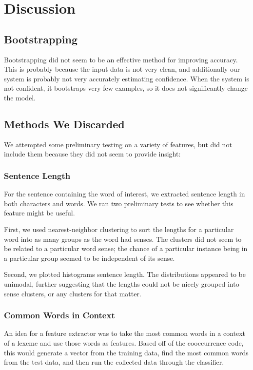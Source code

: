\documentclass{article}
\begin{document}
\section{Discussion}

\subsection{Bootstrapping}

Bootstrapping did not seem to be an effective method for improving accuracy.  This is probably because the input data is not very clean, and additionally our system is probably not very accurately estimating confidence.  When the system is not confident, it bootstraps very few examples, so it does not significantly change the model.

\subsection{Methods We Discarded}

We attempted some preliminary testing on a variety of features, but did not include them because they did not seem to provide insight:

\subsubsection{Sentence Length}
For the sentence containing the word of interest, we extracted sentence length in both characters and words. We ran two preliminary tests to see whether this feature might be useful.

First, we used nearest-neighbor clustering to sort the lengths for a particular word into as many groups as the word had senses. The clusters did not seem to be related to a particular word sense; the chance of a particular instance being in a particular group seemed to be independent of its sense.

Second, we plotted histograms sentence length. The distributions appeared to be unimodal, further suggesting that the lengths could not be nicely grouped into sense clusters, or any clusters for that matter.

\subsubsection{Common Words in Context}
An idea for a feature extractor was to take the most common words in a context of a lexeme and use those words as features. Based off of the cooccurrence code, this would generate a vector from the training data, find the most common words from the test data, and then run the collected data through the classifier.
\end{document}
